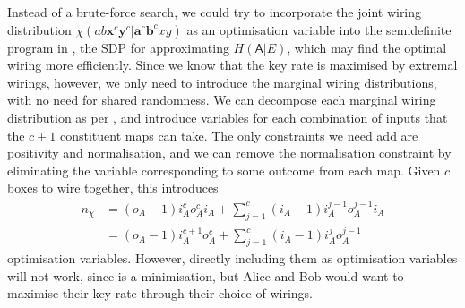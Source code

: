 \documentclass[10pt, a4paper]{article}
\numberwithin{equation}{section} %
\theoremstyle{definition}
\theoremstyle{plain}
\newcommand{\?}{\mathrel{?}} %
\newcommand{\cvec}[1]{\boldsymbol{\mathbf{#1}}}    %
\newcommand{\crv}[1]{\mathsf{#1}}
\begin{document}
                  Instead of a brute-force search, we could try to incorporate the joint wiring distribution \(\chi(ab\cvec{x}^c\cvec{y}^c|\cvec{a}^c\cvec{b}^cxy)\) as an optimisation variable into the semidefinite program in , the SDP for approximating \(H(\crv{A}|E)\), which may find the optimal wiring more efficiently. Since we know that the key rate is maximised by extremal wirings, however, we only need to introduce the marginal wiring distributions, with no need for shared randomness. We can decompose each marginal wiring distribution as per , and introduce variables for each combination of inputs that the \(c+1\) constituent maps can take. The only constraints we need add are positivity and normalisation, and we can remove the normalisation constraint by eliminating the variable corresponding to some outcome from each map. Given \(c\) boxes to wire together, this introduces
                  \begin{align}
                    n_{\chi} &= (o_A - 1) i_A^c o_A^c i_A + \sum_{j=1}^c (i_A-1) i_A^{j-1} o_A^{j-1} i_A \\
                             &= (o_A - 1) i_A^{c+1} o_A^c + \sum_{j=1}^c (i_A-1) i_A^{j} o_A^{j-1}
                  \end{align}
                  optimisation variables. However, directly including them as optimisation variables will not work, since  is a minimisation, but Alice and Bob would want to maximise their key rate through their choice of wirings.
\end{document}
